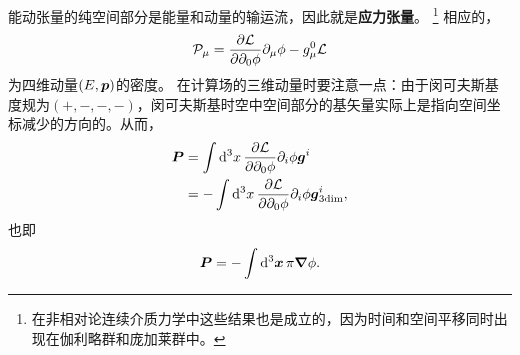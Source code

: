 \documentclass[hyperref, UTF8, a4paper]{ctexart}
\begin{document}
能动张量的纯空间部分是能量和动量的输运流，因此就是\textbf{应力张量}。%
\footnote{在非相对论连续介质力学中这些结果也是成立的，因为时间和空间平移同时出现在伽利略群和庞加莱群中。}
相应的，
\begin{equation}
    \mathcal{P}_\mu = \pdv{\mathcal{L}}{\partial_0 \phi} \partial_\mu \phi - g_\mu^0 \mathcal{L}
\end{equation}
为四维动量$(E, \vb*{p})$的密度。
在计算场的三维动量时要注意一点：由于闵可夫斯基度规为$(+, -, -, -)$，闵可夫斯基时空中空间部分的基矢量实际上是指向空间坐标减少的方向的。从而，
\[
    \begin{aligned}
        \vb*{P} &= \int \dd[3]{x} \pdv{\mathcal{L}}{\partial_0 \phi} \partial_i \phi \vb*{g}^i \\
        &= - \int \dd[3]{x} \pdv{\mathcal{L}}{\partial_0 \phi} \partial_i \phi \vb*{g}^i_{\text{3dim}},
    \end{aligned}
\]
也即
\begin{equation}
    \vb*{P} = - \int \dd[3]{\vb*{x}} \pi \grad{\phi}.
\end{equation}
\end{document}
